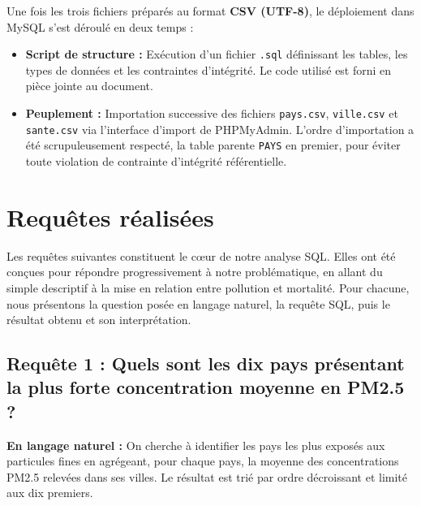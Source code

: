 \documentclass[mstat,12pt]{unswthesis}
\begin{document}
Une fois les trois fichiers préparés au format \textbf{CSV (UTF-8)}, le
déploiement dans MySQL s'est déroulé en deux temps :

\medskip

\begin{itemize}
  \item \textbf{Script de structure :} Exécution d'un fichier \texttt{.sql} définissant les tables, les types de données et les contraintes d'intégrité. Le code utilisé est forni en pièce jointe au document.
\end{itemize}

\medskip

\medskip

\begin{itemize}
  \item \textbf{Peuplement :} Importation successive des fichiers \texttt{pays.csv}, \texttt{ville.csv} et \texttt{sante.csv} via l'interface d'import de PHPMyAdmin. L'ordre d'importation a été scrupuleusement respecté, la table parente \texttt{PAYS} en premier, pour éviter toute violation de contrainte d'intégrité référentielle.
\end{itemize}

\section{Requêtes réalisées}\label{requuxeates-ruxe9alisuxe9es}

Les requêtes suivantes constituent le cœur de notre analyse SQL. Elles
ont été conçues pour répondre progressivement à notre problématique, en
allant du simple descriptif à la mise en relation entre pollution et
mortalité. Pour chacune, nous présentons la question posée en langage
naturel, la requête SQL, puis le résultat obtenu et son interprétation.

\medskip

\subsection{Requête 1 : Quels sont les dix pays présentant la plus forte
concentration moyenne en PM2.5
?}\label{requuxeate-1-quels-sont-les-dix-pays-pruxe9sentant-la-plus-forte-concentration-moyenne-en-pm2.5}

\textbf{En langage naturel :} On cherche à identifier les pays les plus
exposés aux particules fines en agrégeant, pour chaque pays, la moyenne
des concentrations PM2.5 relevées dans ses villes. Le résultat est trié
par ordre décroissant et limité aux dix premiers.
\end{document}
